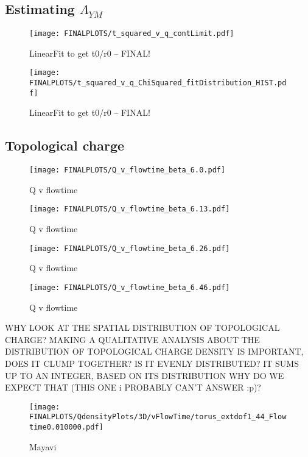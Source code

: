 \documentclass[a4paper,10pt]{article}
\begin{document}
\subsection{Estimating $\Lambda_{YM}$}
\begin{figure}[H]
\centering
\texttt{[image: FINALPLOTS/t\_squared\_v\_q\_contLimit.pdf]}
\caption[]{LinearFit to get t0/r0 -- FINAL!}\label{fig:PLACEHOLDER}
\end{figure}



\begin{figure}[H]
\centering
\texttt{[image: FINALPLOTS/t\_squared\_v\_q\_ChiSquared\_fitDistribution\_HIST.pdf]}
\caption[]{LinearFit to get t0/r0 -- FINAL!}\label{fig:PLACEHOLDER}
\end{figure}

\subsection{Topological charge}
\begin{figure}[H]
\centering
\texttt{[image: FINALPLOTS/Q\_v\_flowtime\_beta\_6.0.pdf]}
\caption[]{Q v flowtime}\label{fig:PLACEHOLDER}
\end{figure}

\begin{figure}[H]
\centering
\texttt{[image: FINALPLOTS/Q\_v\_flowtime\_beta\_6.13.pdf]}
\caption[]{Q v flowtime}\label{fig:PLACEHOLDER}
\end{figure}

\begin{figure}[H]
\centering
\texttt{[image: FINALPLOTS/Q\_v\_flowtime\_beta\_6.26.pdf]}
\caption[]{Q v flowtime}\label{fig:PLACEHOLDER}
\end{figure}

\begin{figure}[H]
\centering
\texttt{[image: FINALPLOTS/Q\_v\_flowtime\_beta\_6.46.pdf]}
\caption[]{Q v flowtime}\label{fig:PLACEHOLDER}
\end{figure}


WHY LOOK AT THE SPATIAL DISTRIBUTION OF TOPOLOGICAL CHARGE? MAKING A QUALITATIVE ANALYSIS ABOUT THE DISTRIBUTION OF TOPOLOGICAL CHARGE DENSITY IS IMPORTANT, DOES IT CLUMP TOGETHER? IS IT EVENLY DISTRIBUTED? IT SUMS UP TO AN INTEGER, BASED ON ITS DISTRIBUTION WHY DO WE EXPECT THAT (THIS ONE i PROBABLY CAN'T ANSWER :p)? 



\begin{figure}[H]
\centering
\texttt{[image: FINALPLOTS/QdensityPlots/3D/vFlowTime/torus\_extdof1\_44\_Flowtime0.010000.pdf]}
\caption[]{Mayavi \cite{ramachandran2011mayavi}}\label{fig:PLACEHOLDER}
\end{figure}
\end{document}

